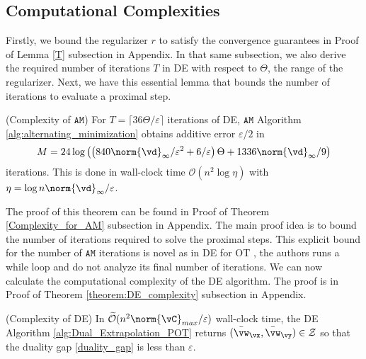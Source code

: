 \subsection{Computational Complexities}
Firstly, we bound the regularizer $r$ to satisfy the convergence guarantees \citep{Jambulapati-2019-Direct} in Proof of Lemma \ref{T} subsection in Appendix. In that same subsection, we also derive the required number of iterations $T$ in DE with respect to $\Theta$, the range of the regularizer. Next, we have this essential lemma that bounds the number of iterations to evaluate a proximal step.
\begin{theorem} \label{Complexity_for_AM}
    (Complexity of $\mathtt{AM}$) For $T = \lceil 36 \Theta/\varepsilon \rceil$ iterations of DE, $\mathtt{AM}$ Algorithm \ref{alg:alternating_minimization} obtains additive error $\varepsilon / 2$ in 
    \begin{equation*}
        M = 24 \log \left( \left( 840 \norm{\vd}_\infty / \varepsilon^2 + 6 / \varepsilon \right) \Theta + 1336 \norm{\vd}_\infty / 9 \right)
    \end{equation*}
    iterations. This is done in wall-clock time $\mathcal{O}(n^2 \log \eta)$ with $\eta = \log n \norm{\vd}_\infty / \varepsilon$.
\end{theorem}
The proof of this theorem can be found in Proof of Theorem \ref{Complexity_for_AM} subsection in Appendix. The main proof idea is to  bound the number of iterations required to solve the proximal steps. This explicit bound for the number of $\mathtt{AM}$ iterations is novel as in DE for OT \cite{Jambulapati-2019-Direct}, the authors runs a while loop and do not analyze its final number of iterations. We can now calculate the computational complexity of the DE algorithm. The proof is in Proof of Theorem \ref{theorem:DE_complexity} subsection in Appendix.
\begin{theorem} (Complexity of DE)
    \label{theorem:DE_complexity}
    In $\mathcal{\widetilde O}(n^2 \norm{\vC}_{max} / \varepsilon)$ wall-clock time, the DE Algorithm \ref{alg:Dual_Extrapolation_POT} returns $(\bar{\vw}_{\vx}, \bar{\vw}_{\vy}) \in \mathcal{Z}$ so that the duality gap \eqref{duality_gap} is less than $\varepsilon$.
\end{theorem}

